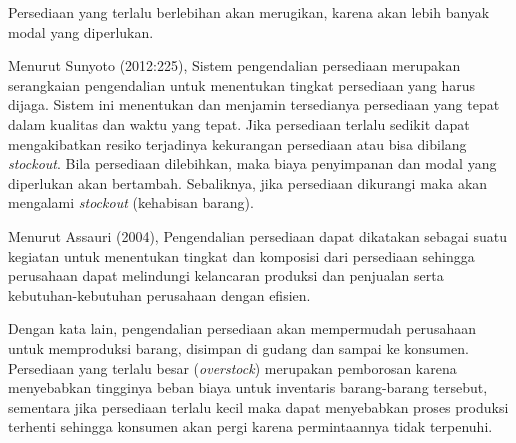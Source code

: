 Persediaan yang terlalu berlebihan akan merugikan, karena akan lebih banyak modal yang diperlukan.

Menurut Sunyoto (2012:225), Sistem pengendalian persediaan merupakan serangkaian pengendalian untuk menentukan tingkat persediaan yang harus dijaga. Sistem ini menentukan dan menjamin tersedianya persediaan yang tepat dalam kualitas dan waktu yang tepat. Jika persediaan terlalu sedikit dapat mengakibatkan resiko terjadinya kekurangan persediaan atau bisa dibilang \textit{stockout}. Bila persediaan dilebihkan, maka biaya penyimpanan dan modal yang diperlukan akan bertambah. Sebaliknya, jika persediaan dikurangi maka akan mengalami \textit{stockout} (kehabisan barang).
 
Menurut Assauri (2004), Pengendalian persediaan dapat dikatakan sebagai suatu kegiatan untuk menentukan tingkat dan komposisi dari persediaan sehingga perusahaan dapat melindungi kelancaran produksi dan penjualan serta kebutuhan-kebutuhan perusahaan dengan efisien.

Dengan kata lain, pengendalian persediaan akan mempermudah perusahaan untuk memproduksi barang, disimpan di gudang dan sampai ke konsumen. Persediaan yang terlalu besar (\textit{overstock}) merupakan pemborosan karena menyebabkan tingginya beban biaya untuk inventaris barang-barang tersebut, sementara jika persediaan terlalu kecil maka dapat menyebabkan proses produksi terhenti sehingga konsumen akan pergi karena permintaannya tidak terpenuhi.


	

	

	

